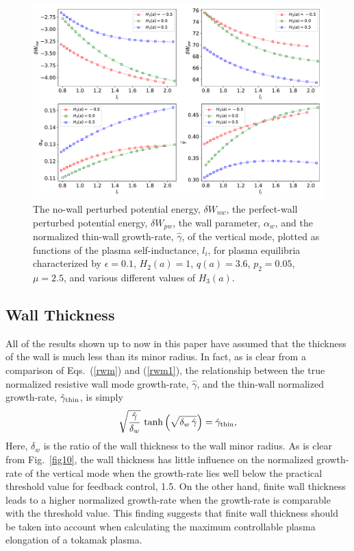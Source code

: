 \documentclass[12pt,prb,aps]{revtex4-1}
\begin{document}
\begin{figure}
\centerline{\includegraphics[width=\textwidth]{Fig7.pdf}}
\caption{The no-wall perturbed potential energy, $\delta W_{nw}$, the perfect-wall perturbed potential energy, $\delta W_{pw}$, the wall
parameter, $\alpha_w$, and the normalized thin-wall growth-rate, $\hat{\gamma}$,  of the vertical mode, plotted as  functions of the
plasma self-inductance, $l_i$, for plasma equilibria characterized by  $\epsilon=0.1$, $H_2(a)=1$,   $q(a)=3.6$, $p_2=0.05$, $\mu=2.5$, and various different values of $H_3(a)$.\label{fig7}}
\end{figure}

\subsection{Wall Thickness}
All of the results shown up to now in this paper have assumed that the thickness of the wall is much less than its minor radius. In fact, as
is clear from a comparison of Eqs.~(\ref{rwm}) and (\ref{rwm1}), the relationship between the true normalized resistive wall mode growth-rate, $\hat{\gamma}$, and the
thin-wall normalized growth-rate, $\hat{\gamma}_{\rm thin}$, is simply
\begin{equation}
\sqrt{\frac{\hat{\gamma}}{\delta_w}}\,\tanh\left(\sqrt{\delta_w\,\hat{\gamma}}\right)= \hat{\gamma}_{\rm thin},
\end{equation}
Here, $\delta_w$ is the ratio of the wall thickness to the wall minor radius. As is clear from Fig.~\ref{fig10}, the wall thickness has little influence on the
normalized growth-rate of the vertical mode when the growth-rate lies well below the practical threshold value for feedback control, 1.5. On the other
hand, finite wall thickness leads to a higher normalized growth-rate when the growth-rate is comparable with the threshold value. This finding
suggests that finite wall thickness should be taken into account when calculating the maximum controllable plasma elongation of a tokamak plasma. 
\end{document}
